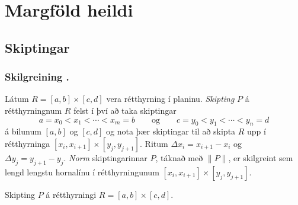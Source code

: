 
\theoremstyle{definition}
\newtheorem{exercise}[theorem]{}





\newbox\mytempbox
\newdimen\mytempdimen

\newcommand\includegraphicscopyright[3][]{%
  \leavevmode\vbox{\vskip3pt\raggedright\setbox\mytempbox=\hbox{\texttt{[image: \#2]}}%
    \mytempdimen=\wd\mytempbox\box\mytempbox\par\vskip1pt%
    \fontsize{3}{3.5}\selectfont{\color{black!25}{\vbox{\hsize=\mytempdimen#3}}}\vskip3pt%
}}

\newenvironment{colortabular}[1]{\medskip\rowcolors[]{1}{blue!20}{blue!10}\tabular{#1}\rowcolor{blue!40}}{\endtabular\medskip}

\def\equad{\leavevmode\hbox{}\quad}

\newenvironment{greencolortabular}[1]
{\medskip\rowcolors[]{1}{green!50!black!20}{green!50!black!10}%
  \tabular{#1}\rowcolor{green!50!black!40}}%
{\endtabular\medskip}




\section{Margföld heildi}


\subsection{Skiptingar} 

\subsubsection{Skilgreining \kaflanr.}
Látum $R=[a,b]\times[c,d]$ vera
rétthyrning í planinu.  {\em Skipting} $P$ á rétthyrningnum $R$ felst í
því að taka skiptingar
$$a=x_0<x_1<\cdots<x_m=b\qquad\mbox{og}\qquad
c=y_0<y_1<\cdots<y_n=d$$
 á bilunum $[a,b]$ og $[c,d]$ og nota þær skiptingar til að skipta $R$
 upp í rétthyrninga $[x_i,x_{i+1}]\times [y_j,y_{j+1}]$.  
Ritum $\Delta x_i=x_{i+1}-x_i$ og  $\Delta y_j=y_{j+1}-y_j$.
{\em Norm} skiptingarinnar $P$, táknað með $\|P\|$,  
er skilgreint sem lengd lengstu hornalínu í
   rétthyrningunum $[x_i,x_{i+1}]\times [y_j,y_{j+1}]$.



Skipting $P$ á rétthyrningi $R= [a,b]\times [c,d]$.

